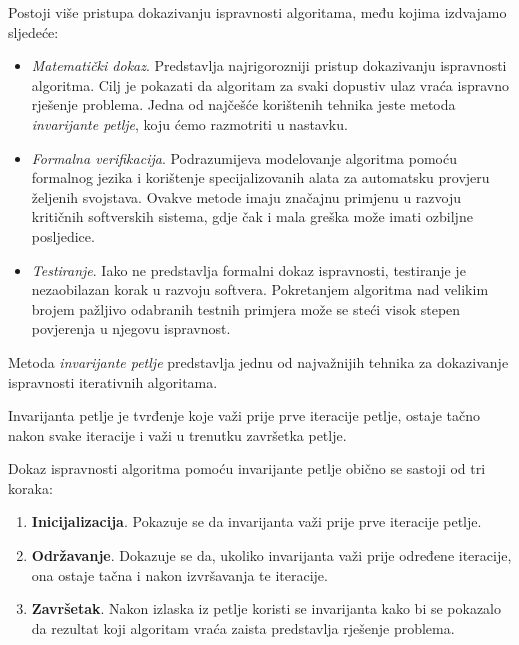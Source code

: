 Postoji više pristupa dokazivanju ispravnosti algoritama, među kojima izdvajamo sljedeće:

\begin{itemize}
	\item \textit{Matematički dokaz}. Predstavlja najrigorozniji pristup dokazivanju ispravnosti algoritma. Cilj je pokazati da algoritam za svaki dopustiv ulaz vraća ispravno rješenje problema. Jedna od najčešće korištenih tehnika jeste metoda \textit{invarijante petlje}, koju ćemo razmotriti u nastavku.
	
	\item \textit{Formalna verifikacija}. Podrazumijeva modelovanje algoritma pomoću formalnog jezika i korištenje specijalizovanih alata za automatsku provjeru željenih svojstava. Ovakve metode imaju značajnu primjenu u razvoju kritičnih softverskih sistema, gdje čak i mala greška može imati ozbiljne posljedice.
	
	\item \textit{Testiranje}. Iako ne predstavlja formalni dokaz ispravnosti, testiranje je nezaobilazan korak u razvoju softvera. Pokretanjem algoritma nad velikim brojem pažljivo odabranih testnih primjera može se steći visok stepen povjerenja u njegovu ispravnost.
	
\end{itemize}


Metoda \textit{invarijante petlje} predstavlja jednu od najvažnijih tehnika za dokazivanje ispravnosti iterativnih algoritama.

\begin{definition}
	Invarijanta petlje je tvrđenje koje važi prije prve iteracije petlje, ostaje tačno nakon svake iteracije i važi u trenutku završetka petlje.
\end{definition}

Dokaz ispravnosti algoritma pomoću invarijante petlje obično se sastoji od tri koraka:

\begin{enumerate}
	\item \textbf{Inicijalizacija}. Pokazuje se da invarijanta važi prije prve iteracije petlje.
	
	\item \textbf{Održavanje}. Dokazuje se da, ukoliko invarijanta važi prije određene iteracije, ona ostaje tačna i nakon izvršavanja te iteracije.
	
	\item \textbf{Završetak}. Nakon izlaska iz petlje koristi se invarijanta kako bi se pokazalo da rezultat koji algoritam vraća zaista predstavlja rješenje problema.
	
\end{enumerate}

